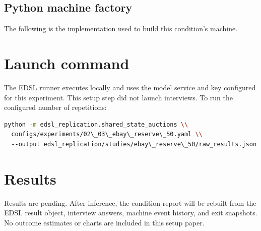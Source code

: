 \documentclass[11pt]{article}
\begin{document}
\subsection{Python machine factory}
The following is the implementation used to build this condition's machine.


\section{Launch command}
The EDSL runner executes locally and uses the model service and key configured
for this experiment. This setup step did not launch interviews. To run the
configured number of repetitions:
\begin{lstlisting}[language=bash]
python -m edsl_replication.shared_state_auctions \\
  configs/experiments/02\_03\_ebay\_reserve\_50.yaml \\
  --output edsl_replication/studies/ebay\_reserve\_50/raw_results.json
\end{lstlisting}
\section{Results}
Results are pending. After inference, the condition report will be rebuilt from
the EDSL result object, interview answers, machine event history, and exit
snapshots. No outcome estimates or charts are included in this setup paper.
\end{document}
